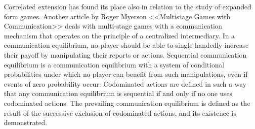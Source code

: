 Correlated extension has found its place also in relation to the study of expanded form games. Another article by Roger Myerson <<Multistage Games with Communication>> \cite{Myerson86} deals with multi-stage games with a communication mechanism that operates on the principle of a centralized intermediary. In a communication equilibrium, no player should be able to single-handedly increase their payoff by manipulating their reports or actions. Sequential communication equilibrium is a communication equilibrium with a system of conditional probabilities under which no player can benefit from such manipulations, even if events of zero probability occur. Codominated actions are defined in such a way that any communication equilibrium is sequential if and only if no one uses codominated actions. The prevailing communication equilibrium is defined as the result of the successive exclusion of codominated actions, and its existence is demonstrated. %

